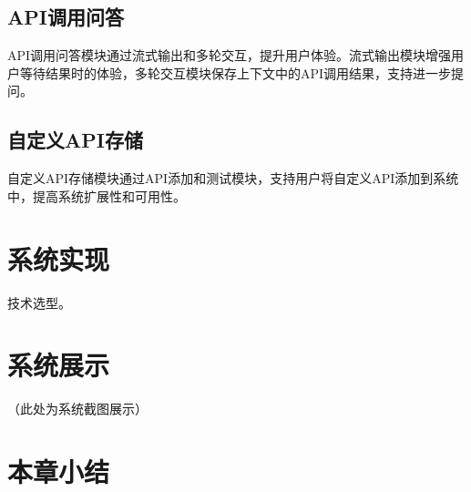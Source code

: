\subsection{API调用问答}
API调用问答模块通过流式输出和多轮交互，提升用户体验。流式输出模块增强用户等待结果时的体验，多轮交互模块保存上下文中的API调用结果，支持进一步提问。

\subsection{自定义API存储}
自定义API存储模块通过API添加和测试模块，支持用户将自定义API添加到系统中，提高系统扩展性和可用性。

\section{系统实现}

技术选型。



\section{系统展示}
（此处为系统截图展示）

\section{本章小结}
